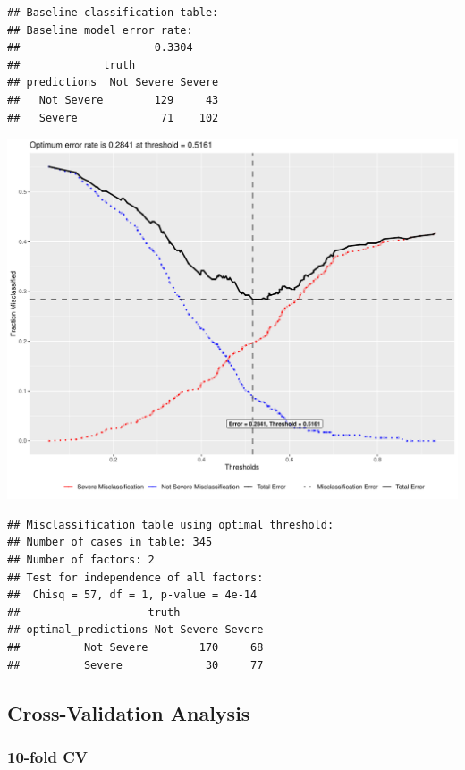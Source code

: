 \documentclass[
  11pt,
  a4paper,
]{scrartcl}
\begin{document}
\begin{verbatim}
## Baseline classification table: 
## Baseline model error rate: 
##                     0.3304 
##             truth
## predictions  Not Severe Severe
##   Not Severe        129     43
##   Severe             71    102
\end{verbatim}

\begin{center}\includegraphics{figure/analysis-glm-optimal-error-1} \end{center}

\begin{verbatim}
## Misclassification table using optimal threshold: 
## Number of cases in table: 345 
## Number of factors: 2 
## Test for independence of all factors:
##  Chisq = 57, df = 1, p-value = 4e-14
##                    truth
## optimal_predictions Not Severe Severe
##          Not Severe        170     68
##          Severe             30     77
\end{verbatim}

\newpage

\hypertarget{cross-validation-analysis}{%
\subsection{Cross-Validation Analysis}\label{cross-validation-analysis}}

\hypertarget{fold-cv}{%
\subsubsection{10-fold CV}\label{fold-cv}}
\end{document}
